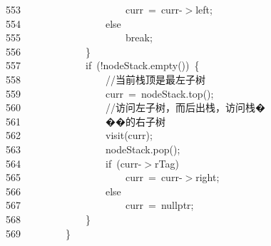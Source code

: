 \documentclass[11pt,a4paper]{ctexart}
\newcommand{\hlstd}[1]{\textcolor[rgb]{0.2,0.2,0.2}{#1}}
\newcommand{\hlslc}[1]{\textcolor[rgb]{0.59,0.59,0.59}{#1}}
\newcommand{\hlopt}[1]{\textcolor[rgb]{0.2,0.2,0.2}{#1}}
\newcommand{\hllin}[1]{\textcolor[rgb]{0.59,0.59,0.59}{#1}}
\newcommand{\hlkwa}[1]{\textcolor[rgb]{0.23,0.42,0.78}{#1}}
\newcommand{\hlkwc}[1]{\textcolor[rgb]{0,0.63,0.31}{#1}}
\newcommand{\hlkwd}[1]{\textcolor[rgb]{0.78,0.23,0.41}{#1}}
\begin{document}
\hllin{553\ }\hlstd{}\hlstd{\ \ \ \ \ \ \ \ \ \ \ \ \ \ \ \ \ \ \ \ }\hlstd{curr\ }\hlopt{=\ }\hlstd{curr}\hlopt{{-}$>$}\hlstd{left}\hlopt{;}\\
\hllin{554\ }\hlstd{}\hlstd{\ \ \ \ \ \ \ \ \ \ \ \ \ \ \ \ }\hlstd{}\hlkwa{else}\\
\hllin{555\ }\hlstd{}\hlstd{\ \ \ \ \ \ \ \ \ \ \ \ \ \ \ \ \ \ \ \ }\hlstd{}\hlkwa{break}\hlstd{}\hlopt{;}\\
\hllin{556\ }\hlstd{}\hlstd{\ \ \ \ \ \ \ \ \ \ \ \ }\hlstd{}\hlopt{\}}\\
\hllin{557\ }\hlstd{}\hlstd{\ \ \ \ \ \ \ \ \ \ \ \ }\hlstd{}\hlkwa{if\ }\hlstd{}\hlopt{(!}\hlstd{nodeStack}\hlopt{.}\hlstd{}\hlkwd{empty}\hlstd{}\hlopt{())\ \{}\\
\hllin{558\ }\hlstd{}\hlstd{\ \ \ \ \ \ \ \ \ \ \ \ \ \ \ \ }\hlstd{}\hlslc{//当前栈顶是最左子树}\\
\hllin{559\ }\hlstd{}\hlstd{\ \ \ \ \ \ \ \ \ \ \ \ \ \ \ \ }\hlstd{curr\ }\hlopt{=\ }\hlstd{nodeStack}\hlopt{.}\hlstd{}\hlkwd{top}\hlstd{}\hlopt{();}\\
\hllin{560\ }\hlstd{}\hlstd{\ \ \ \ \ \ \ \ \ \ \ \ \ \ \ \ }\hlstd{}\hlslc{//访问左子树，而后出栈，访问栈�}\Righttorque\\
\hllin{561\ }\hlslc{}\hlstd{\ \ \ \ \ \ \ \ \ \ \ \ \ \ \ \ }\hlslc{��的右子树}\\
\hllin{562\ }\hlstd{}\hlstd{\ \ \ \ \ \ \ \ \ \ \ \ \ \ \ \ }\hlstd{}\hlkwd{visit}\hlstd{}\hlopt{(}\hlstd{curr}\hlopt{);}\\
\hllin{563\ }\hlstd{}\hlstd{\ \ \ \ \ \ \ \ \ \ \ \ \ \ \ \ }\hlstd{nodeStack}\hlopt{.}\hlstd{}\hlkwd{pop}\hlstd{}\hlopt{();}\\
\hllin{564\ }\hlstd{}\hlstd{\ \ \ \ \ \ \ \ \ \ \ \ \ \ \ \ }\hlstd{}\hlkwa{if\ }\hlstd{}\hlopt{(}\hlstd{curr}\hlopt{{-}$>$}\hlstd{rTag}\hlopt{)}\\
\hllin{565\ }\hlstd{}\hlstd{\ \ \ \ \ \ \ \ \ \ \ \ \ \ \ \ \ \ \ \ }\hlstd{curr\ }\hlopt{=\ }\hlstd{curr}\hlopt{{-}$>$}\hlstd{right}\hlopt{;}\\
\hllin{566\ }\hlstd{}\hlstd{\ \ \ \ \ \ \ \ \ \ \ \ \ \ \ \ }\hlstd{}\hlkwa{else}\\
\hllin{567\ }\hlstd{}\hlstd{\ \ \ \ \ \ \ \ \ \ \ \ \ \ \ \ \ \ \ \ }\hlstd{curr\ }\hlopt{=\ }\hlstd{}\hlkwc{nullptr}\hlstd{}\hlopt{;}\\
\hllin{568\ }\hlstd{}\hlstd{\ \ \ \ \ \ \ \ \ \ \ \ }\hlstd{}\hlopt{\}}\\
\hllin{569\ }\hlstd{}\hlstd{\ \ \ \ \ \ \ \ }\hlstd{}\hlopt{\}}\\
\end{document}
